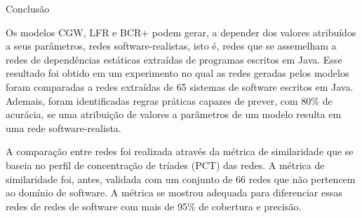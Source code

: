 \begin{section}{Conclusão}
	
	Os modelos CGW, LFR e BCR+ podem gerar, a depender dos valores atribuídos a seus parâmetros, redes software-realistas, isto é, redes que se assemelham a redes de dependências estáticas extraídas de programas escritos em Java. Esse resultado foi obtido em um experimento no qual as redes geradas pelos modelos foram comparadas a redes extraídas de 65 sistemas de software escritos em Java. Ademais, foram identificadas regras práticas capazes de prever, com 80\% de acurácia, se uma atribuição de valores a parâmetros de um modelo resulta em uma rede software-realista.
	
	 A comparação entre redes foi realizada através da métrica de similaridade que se baseia no perfil de concentração de tríades (PCT) das redes. A métrica de similaridade foi, antes, validada com um conjunto de 66 redes que não pertencem ao domínio de software. A métrica se mostrou adequada para diferenciar essas redes de redes de software com mais de 95\% de cobertura e precisão.
	
\end{section}
 
